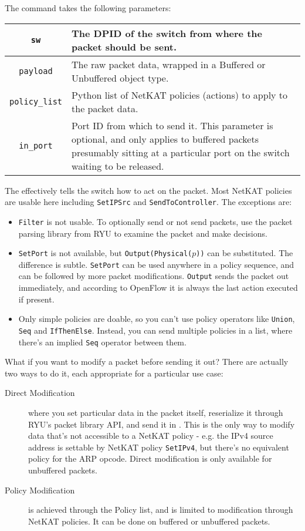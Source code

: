 The command takes the following parameters:

\bigskip
\begin{tabularx}{\linewidth}{|c|X|}
\hline\hline
\texttt{sw} & The DPID of the switch from where the packet should be sent.
\\ \hline
\texttt{payload} & The raw packet data, wrapped in a 
Buffered or Unbuffered object type.
\\ \hline
\texttt{policy\_list} & Python list of NetKAT policies (actions) to apply to the packet data.
\\ \hline
\texttt{in\_port} & Port ID from which to send it.
This parameter is optional, and only applies to buffered packets presumably sitting at a particular port on
the switch waiting to be released.
\\ \hline\hline
\end{tabularx}

\bigskip

The  effectively tells the switch how to act on the packet.  
Most NetKAT policies are usable here including \texttt{SetIPSrc} and \texttt{SendToController}.  The
exceptions are:

\begin{itemize}
  \item \texttt{Filter} is not usable.  To optionally send or not send packets, use the packet parsing library
  from RYU to examine the packet and make decisions.  
  \item \texttt{SetPort} is not available, but \texttt{Output(Physical($p$))} can be substituted.  The 
  difference is subtle.  \texttt{SetPort} can be used anywhere in a policy sequence, and can be followed
  by more packet modifications.  \texttt{Output} sends the packet out immediately, and according to OpenFlow
  it is always the last action executed if present.   
  \item Only simple policies are doable, so you can't use policy operators like \texttt{Union}, \texttt{Seq} 
  and \texttt{IfThenElse}.  Instead, you can send multiple policies in a list, where there's an implied \texttt{Seq} 
  operator between them.
\end{itemize}

What if you want to modify a packet before sending it out?  
There are actually two ways to do it, each appropriate for a particular use case:

\begin{description}
  \item[Direct Modification] where you set particular data in the packet itself, reserialize it through RYU's packet
  library API, and send it in .  
  This is the only way to modify data that's not accessible to a NetKAT policy - e.g. the IPv4 source address is
  settable by NetKAT policy \texttt{SetIPv4}, but there's no equivalent policy for the ARP opcode.  
  Direct modification is only available for unbuffered packets.
  \item[Policy Modification] is achieved through the Policy list, and is limited to modification through NetKAT
  policies.
  It can be done on buffered or unbuffered packets.
\end{description}

